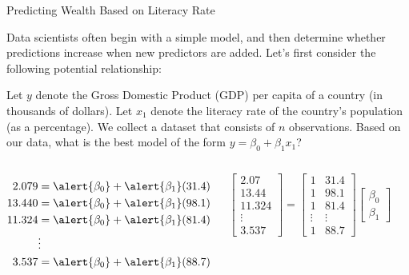 \documentclass[xcolor=dvipsnames,aspectratio=169,t]{beamer}
\begin{document}
\begin{frame}{Predicting Wealth Based on Literacy Rate}

  {\small Data scientists often begin with a simple model, and then determine whether predictions increase when new predictors are added. Let's first consider the following potential relationship:}

  {\small
  \bi
  \ii Let $y$ denote the Gross Domestic Product (GDP) per capita of a country (in thousands of dollars).
  \ii Let $x_{1}$ denote the literacy rate of the country's population (as a percentage).
  \ii We collect a dataset that consists of $n$ observations.
  \ii Based on our data, what is the best model of the form $y = \beta_0 + \beta_1 x_1$?
  \ei
  }

  \vspace{-0.1in}

  \begin{columns}[T]

  \column{0.33\tw}

  \begin{align*}
  2.079 &= \alert{\beta_0} + \alert{\beta_1} (31.4) \\
  13.440 &= \alert{\beta_0} + \alert{\beta_1} (98.1) \\
  11.324 &= \alert{\beta_0} + \alert{\beta_1} (81.4) \\
  & \vdots  \\
  3.537 &= \alert{\beta_0} + \alert{\beta_1} (88.7) \\ 
  \end{align*}

  \column{0.33\tw}

  \[ \begin{bmatrix} 2.07 \\ 13.44 \\ 11.324 \\ \vdots \\ 3.537 \end{bmatrix} = \begin{bmatrix} 1 & 31.4 \\ 1 & 98.1 \\ 1 & 81.4 \\  \vdots &  \vdots \\ 1 & 88.7 \end{bmatrix} \begin{bmatrix} \beta_0 \\ \beta_1 \end{bmatrix} \]

  \column{0.33\tw}


\end{columns}
\end{frame}
\end{document}
